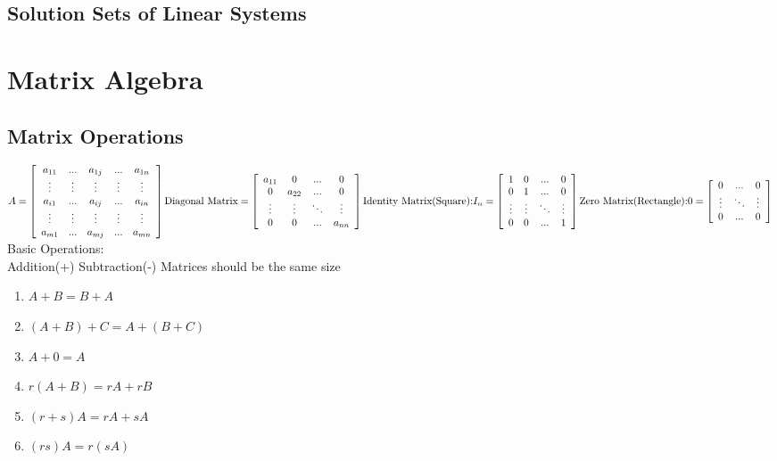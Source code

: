 \documentclass[a4paper,12pt,openany]{book}
\theoremstyle{defn}
\theoremstyle{expl}
\begin{document}
\section{Solution Sets of Linear Systems}
\chapter{Matrix Algebra}
\section{Matrix Operations}
$A = \left[\begin{array}{ccccc}
a_{11}&...&a_{1j}&...&a_{1n}\\
\vdots&\vdots&\vdots&\vdots&\vdots\\
a_{i1}&...&a_{ij}&...&a_{in}\\
\vdots&\vdots&\vdots&\vdots&\vdots\\
a_{m1}&...&a_{mj}&...&a_{mn}
\end{array}\right]
\textup{Diagonal Matrix} = \left[\begin{array}{cccc}
a_{11}&0&...&0\\
0&a_{22}&...&0\\
\vdots&\vdots&\ddots&\vdots\\
0&0&...&a_{nn}
\end{array}\right]\\
\textup{Identity Matrix(Square):} I_n = \left[\begin{array}{cccc}1&0&...&0\\0&1&...&0\\\vdots&\vdots&\ddots&\vdots\\0&0&...&1\end{array}\right] \textup{Zero Matrix(Rectangle):} 0 = \left[\begin{array}{ccc}0&...&0\\\vdots&\ddots&\vdots\\0&...&0\end{array}\right]$\\
Basic Operations:\\
Addition(+) Subtraction(-) Matrices should be the same size\\
\begin{multicols}{2}
\begin{enumerate}
\item $A+B=B+A$
\item $(A+B)+C=A+(B+C)$
\item $A+0=A$
\item $r(A+B)=rA+rB$
\item $(r+s)A=rA+sA$
\item $(rs)A=r(sA)$
\end{enumerate}
\end{multicols}
\end{document}
